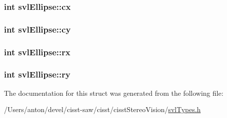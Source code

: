 \subsubsection[{cx}]{\setlength{\rightskip}{0pt plus 5cm}int svl\+Ellipse\+::cx}\label{structsvl_ellipse_a2365044c025f5bb21a507fd68319b2fe}
\hypertarget{structsvl_ellipse_a3e84c8bcbc5c6df40fbd4675afb94f4d}{}
\subsubsection[{cy}]{\setlength{\rightskip}{0pt plus 5cm}int svl\+Ellipse\+::cy}\label{structsvl_ellipse_a3e84c8bcbc5c6df40fbd4675afb94f4d}
\hypertarget{structsvl_ellipse_a7fe1303950ce19bb57c6894b372221b8}{}
\subsubsection[{rx}]{\setlength{\rightskip}{0pt plus 5cm}int svl\+Ellipse\+::rx}\label{structsvl_ellipse_a7fe1303950ce19bb57c6894b372221b8}
\hypertarget{structsvl_ellipse_a55d904daf9ca0fc87fada3a0607f5043}{}
\subsubsection[{ry}]{\setlength{\rightskip}{0pt plus 5cm}int svl\+Ellipse\+::ry}\label{structsvl_ellipse_a55d904daf9ca0fc87fada3a0607f5043}


The documentation for this struct was generated from the following file\+:\begin{DoxyCompactItemize}
\item 
/\+Users/anton/devel/cisst-\/saw/cisst/cisst\+Stereo\+Vision/\hyperlink{svl_types_8h}{svl\+Types.\+h}\end{DoxyCompactItemize}
